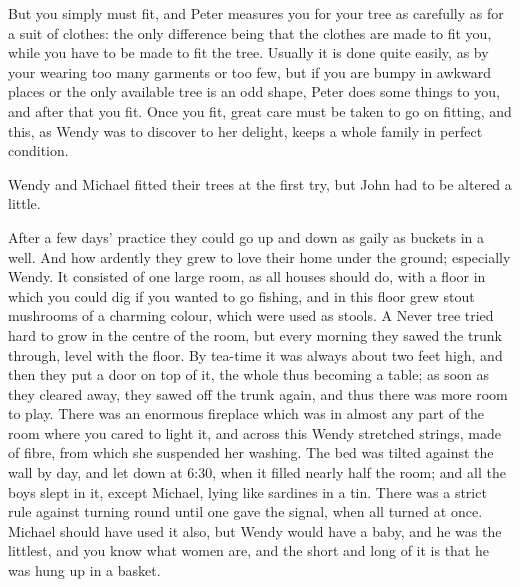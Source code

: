 But you simply must fit, and Peter measures you for your tree as
carefully as for a suit of clothes: the only difference being that the
clothes are made to fit you, while you have to be made to fit the tree.
Usually it is done quite easily, as by your wearing too many garments
or too few, but if you are bumpy in awkward places or the only
available tree is an odd shape, Peter does some things to you, and
after that you fit. Once you fit, great care must be taken to go on
fitting, and this, as Wendy was to discover to her delight, keeps a
whole family in perfect condition.

Wendy and Michael fitted their trees at the first try, but John had to
be altered a little.

After a few days' practice they could go up and down as gaily as
buckets in a well. And how ardently they grew to love their home under
the ground; especially Wendy. It consisted of one large room, as all
houses should do, with a floor in which you could dig if you wanted to
go fishing, and in this floor grew stout mushrooms of a charming
colour, which were used as stools. A Never tree tried hard to grow in
the centre of the room, but every morning they sawed the trunk through,
level with the floor. By tea-time it was always about two feet high,
and then they put a door on top of it, the whole thus becoming a table;
as soon as they cleared away, they sawed off the trunk again, and thus
there was more room to play. There was an enormous fireplace which was
in almost any part of the room where you cared to light it, and across
this Wendy stretched strings, made of fibre, from which she suspended
her washing. The bed was tilted against the wall by day, and let down
at 6:30, when it filled nearly half the room; and all the boys slept in
it, except Michael, lying like sardines in a tin. There was a strict
rule against turning round until one gave the signal, when all turned
at once. Michael should have used it also, but Wendy would have a baby,
and he was the littlest, and you know what women are, and the short and
long of it is that he was hung up in a basket.


